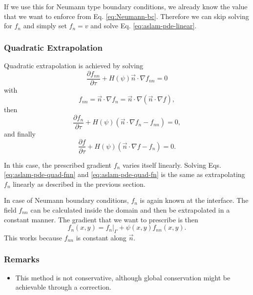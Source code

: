 \documentclass{article}
\numberwithin{equation}{section}
\newcommand{\pd}[2]{\dfrac{\partial #1}{\partial #2}}
\begin{document}
If we use this for Neumann type boundary conditions, we already know the value that we want to enforce from Eq. \eqref{eq:Neumann-bc}.
Therefore we can skip solving for $f_n$ and simply set $f_n = v$ and solve Eq. \eqref{eq:aslam-pde-linear}.

\subsubsection{Quadratic Extrapolation}

Quadratic extrapolation is achieved by solving \cite{aslamPartialDifferentialEquation2004}
\begin{equation}
    \pd{f_{nn}}{\tau} + H(\psi) \vec{n} \cdot \nabla f_{nn} = 0
    \label{eq:aslam-pde-quad-fnn}
\end{equation}
with
\begin{equation}
    f_{nn}
    = \vec{n} \cdot \nabla f_n
    = \vec{n} \cdot \nabla \left(\vec{n} \cdot \nabla f\right),
\end{equation}
then
\begin{equation}
    \pd{f_{n}}{\tau} + H(\psi) \left(\vec{n} \cdot \nabla f_{n} - f_{nn}\right) = 0,
    \label{eq:aslam-pde-quad-fn}
\end{equation}
and finally
\begin{equation}
    \pd{f}{\tau} + H(\psi) \left(\vec{n} \cdot \nabla f - f_{n}\right) = 0.
\end{equation}

In this case, the prescribed gradient $f_n$ varies itself linearly.
Solving Eqs. \eqref{eq:aslam-pde-quad-fnn} and \eqref{eq:aslam-pde-quad-fn} is the same as extrapolating $f_n$ linearly as described in the previous section.

In case of Neumann boundary conditions, $f_n$ is again known at the interface.
The field $f_{nn}$ can be calculated inside the domain and then be extrapolated in a constant manner.
The gradient that we want to prescribe is then
\begin{equation}
    f_n(x, y) = f_n \big\vert_\Gamma + \psi(x, y) f_{nn}(x, y).
\end{equation}
This works because $f_{nn}$ is constant along $\vec{n}$.

\subsubsection{Remarks}

\begin{itemize}
    \item This method is not conservative, although global conservation might be achievable through a correction.
\end{itemize}

\newpage
\printbibliography
\end{document}

